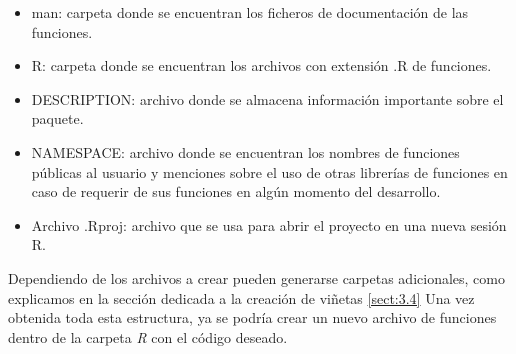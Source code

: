 \begin{itemize}[label=$\bullet$]
    \item man: carpeta donde se encuentran los ficheros de documentación de las funciones.
    \item R: carpeta donde se encuentran los archivos con extensión .R de funciones.
    \item DESCRIPTION: archivo donde se almacena información importante sobre el paquete.
    \item NAMESPACE: archivo donde se encuentran los nombres de funciones públicas al usuario y menciones sobre el uso de otras librerías de funciones en caso de requerir de sus funciones en algún momento del desarrollo.
    \item Archivo .Rproj: archivo que se usa para abrir el proyecto en una nueva sesión R.
\end{itemize}

Dependiendo de los archivos a crear pueden generarse carpetas adicionales, como explicamos en la sección dedicada a la creación de viñetas \ref{sect:3.4}
Una vez obtenida toda esta estructura, ya se podría crear un nuevo archivo de funciones dentro de la carpeta \textit{R} con el código deseado.\\

